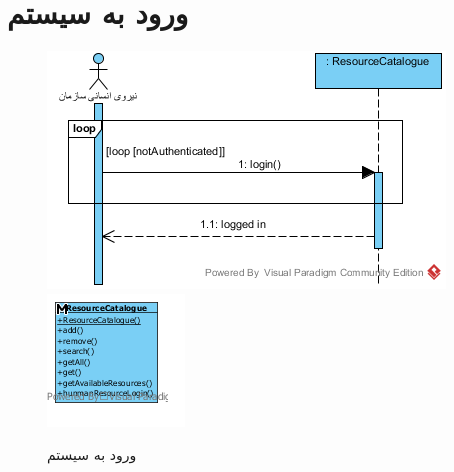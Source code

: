 \section{ورود به سیستم}
\begin{figure}[H]
	\centering
	\includegraphics[scale=0.8]{img/sequence-analysis/SignIn}
	\includegraphics[scale=0.8]{img/sequence-analysis/SignInC}
	\caption{ورود به سیستم}
\end{figure}